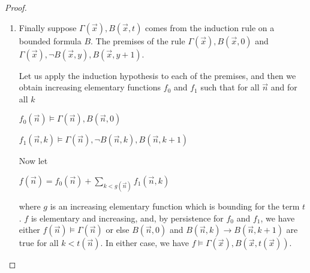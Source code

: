 \documentclass[8pt]{article}
\theoremstyle{definition}
\theoremstyle{definition}
\theoremstyle{definition}
\theoremstyle{definition}
\theoremstyle{definition}
\theoremstyle{definition}
\theoremstyle{definition}
\theoremstyle{definition}
\theoremstyle{definition}
\theoremstyle{definition}
\theoremstyle{definition}
\theoremstyle{definition}
\theoremstyle{definition}
\theoremstyle{question}
\begin{document}
\begin{proof}
\begin{enumerate}
    Without increasing the height of a proof, we can invert all universal quantifiers
    in the first premise. So we have $\neg B(\vec{z})$. $B$ is bounded, so the induction hypothesis
    can be applied to this formula to obtain an elementary function $f_0$ such that, 
    for all assignments $[\vec{x} := \vec{n}]$ and $[\vec{z} := \vec{m}]$
    \begin{center}
      $f_0(\vec{n}, \vec{m}) \models \Gamma(\vec{n}), \neg B(\vec{n}, \vec{m})$
    \end{center}
    Now we apply the induction hypothesis to the second premise of the cut rule, so we have an elementary function
    $f_1$ such that for all $\vec{n}$ either 
    $f_1(\vec{n}) \models \Gamma(\vec{n})$ or there are fixed witnesses $\vec{m} < f_1(\vec{n})$
    such that $B(\vec{n}, \vec{m})$ is true.

    Define $f$ the following way:
    \begin{center}
      $f(\vec{n}) = f_0(\vec{n}, f_1(\vec{n}), \dots, f_1(\vec{n}))$
    \end{center}
    Furthermore $f \models \Gamma$. For otherwise there would be a tuple $\vec{n}$ such that
    $\Gamma(\vec{n})$ is not true at $f(\vec{n})$, so, by persistence, 
    $\Gamma(\vec{n})$ is not true at $f_1(\vec{n})$.
    Thus $B(\vec{n}, \vec{m})$ is true for particular numbers $\vec{m} < f_1(\vec{n})$.
    But then $f_0(\vec{n}, \vec{m}) < f(\vec{n})$, so, by persistence, $\Gamma(\vec{n})$ cannot be true at 
    $f_0(\vec{n}, \vec{m})$. Thus $B(\vec{n}, \vec{m})$ is false, so we have a contradiction.
    \item Finally suppose $\Gamma(\vec{x}), B(\vec{x}, t)$ comes from the induction rule on a bounded formula $B$.
    The premises of the rule $\Gamma(\vec{x}), B(\vec{x}, 0)$ and $\Gamma(\vec{x}), \neg B(\vec{x}, y), B(\vec{x}, y + 1)$.

    Let us apply the induction hypothesis to each of the premises, and then we obtain
    increasing elementary functions $f_0$ and $f_1$ such that for all $\vec{n}$ and for all $k$

    \begin{center}
      $f_0(\vec{n}) \models \Gamma(\vec{n}), B(\vec{n}, 0)$

      $f_1(\vec{n}, k) \models \Gamma(\vec{n}), \neg B(\vec{n}, k), B(\vec{n}, k + 1)$
    \end{center}

    Now let
    \begin{center}
      $f(\vec{n}) = f_0(\vec{n}) + \sum \limits_{k < g(\vec{n})} f_1(\vec{n}, k)$
    \end{center}
    where $g$ is an increasing elementary function which is bounding for the term $t$.
    $f$ is elementary and increasing, and, by persistence for $f_0$ and $f_1$, we have either
    $f(\vec{n}) \models \Gamma(\vec{n})$ or else
    $B(\vec{n}, 0)$ and $B(\vec{n}, k) \to B(\vec{n}, k + 1)$ are true for all $k < t(\vec{n})$.
    In either case, we have $f \models \Gamma(\vec{x}), B(\vec{x}, t(\vec{x}))$.
  \end{enumerate}
\end{proof}
\end{document}
